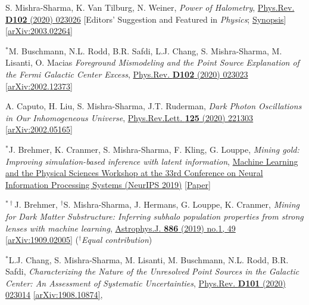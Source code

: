 \documentclass[11pt]{article}
\newenvironment{packed_enumerate}[1][]{
\begin{etaremune}[#1]
  \setlength{\itemsep}{3pt}
  \setlength{\parskip}{0pt}
  \setlength{\parsep}{0pt}}{\end{etaremune}
}
\begin{document}
\begin{packed_enumerate}[start=24]
  \item S. Mishra-Sharma, K. Van Tilburg, N. Weiner, \emph{Power of Halometry}, \href{https://journals.aps.org/prd/abstract/10.1103/PhysRevD.102.023026}{Phys.Rev. \textbf{D102} (2020) 023026} [Editors' Suggestion and Featured in \emph{Physics}; \href{https://physics.aps.org/articles/v13/s98}{Synopsis}]  \href{https://arxiv.org/abs/2003.02264}{[arXiv:2003.02264]}

  \item $^*$M. Buschmann, N.L. Rodd, B.R. Safdi, L.J. Chang, S. Mishra-Sharma, M. Lisanti, O. Macias \emph{Foreground Mismodeling and the Point Source Explanation of the Fermi Galactic Center Excess},  \href{https://journals.aps.org/prd/abstract/10.1103/PhysRevD.102.023023}{Phys.Rev. \textbf{D102} (2020) 023023} \href{https://arxiv.org/abs/2002.12373}{[arXiv:2002.12373]} 

  \item A. Caputo, H. Liu, S. Mishra-Sharma, J.T. Ruderman, \emph{Dark Photon Oscillations in Our Inhomogeneous Universe}, \href{https://journals.aps.org/prl/abstract/10.1103/PhysRevLett.125.221303}{Phys.Rev.Lett. \textbf{125} (2020) 221303}  \href{https://arxiv.org/abs/2002.05165}{[arXiv:2002.05165]}

  \item $^*$J. Brehmer, K. Cranmer, S. Mishra-Sharma, F. Kling, G. Louppe,  \emph{Mining gold: Improving simulation-based inference with latent information}, \href{https://ml4physicalsciences.github.io/2019/}{Machine Learning and the Physical Sciences Workshop at the 33rd Conference on Neural Information Processing Systems (NeurIPS 2019)} \href{https://ml4physicalsciences.github.io/files/NeurIPS_ML4PS_2019_16.pdf}{[Paper]}

  \item $^{*\dagger}$J. Brehmer, $^\dagger$S. Mishra-Sharma, J. Hermans, G. Louppe, K. Cranmer, \emph{Mining for Dark Matter Substructure: Inferring subhalo population properties from strong lenses with machine learning}, \href{https://iopscience.iop.org/article/10.3847/1538-4357/ab4c41}{Astrophys.J. \textbf{886} (2019) no.1, 49} \href{https://arxiv.org/abs/1909.02005}{[arXiv:1909.02005]} ($^\dagger$\emph{Equal contribution})

  \item $^*$L.J. Chang, S. Mishra-Sharma, M. Lisanti, M. Buschmann, N.L. Rodd, B.R. Safdi, \emph{Characterizing the Nature of the Unresolved Point Sources in the Galactic Center: An Assessment of Systematic Uncertainties},  \href{https://journals.aps.org/prd/abstract/10.1103/PhysRevD.101.023014}{Phys.Rev. \textbf{D101} (2020) 023014} \href{https://arxiv.org/abs/1908.10874}{[arXiv:1908.10874]}, 


\end{packed_enumerate}
\end{document}
